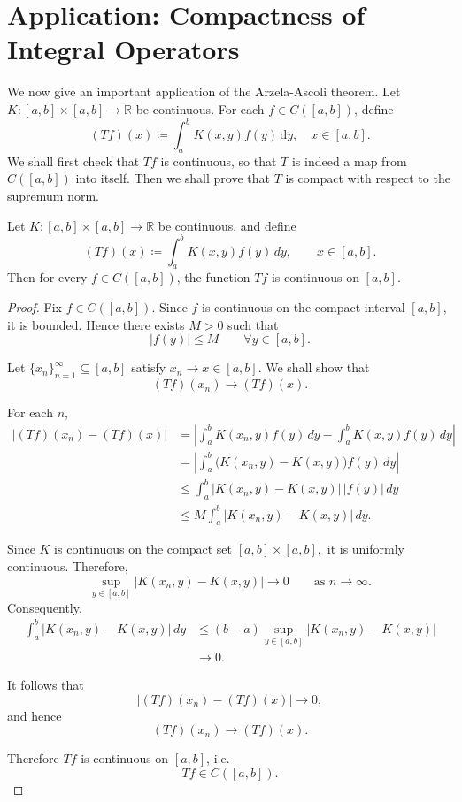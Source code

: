
\section{Application: Compactness of Integral Operators}
We now give an important application of the Arzela-Ascoli theorem. Let \(K : [a, b] \times [a, b] \to \mathbb{R}\) be continuous. For each \(f \in C([a, b])\), define 
\[
    (Tf)(x) \coloneqq \int _a^b K(x, y) f(y) \, \mathrm{d} y, \quad x \in [a, b]. 
\]  
We shall first check that \(Tf\) is continuous, so that \(T\) is indeed a map from \(C([a, b])\) into itself. Then we shall prove that \(T\) is compact with respect to the supremum norm. 

\begin{proposition}
Let \(K : [a,b]\times[a,b]\to\mathbb{R}\) be continuous, and define
\[
    (Tf)(x)\coloneqq \int_a^b K(x,y)f(y)\,dy,
    \qquad x\in[a,b].
\]
Then for every \(f\in C([a,b])\), the function \(Tf\) is continuous on \([a,b]\).
\end{proposition}

\begin{proof}
Fix \(f\in C([a,b])\). Since \(f\) is continuous on the compact interval \([a,b]\), it is bounded. Hence there exists \(M>0\) such that
\[
    |f(y)|\le M
    \qquad \forall y\in[a,b].
\]

Let \(\{x_n\}_{n=1}^\infty \subseteq [a,b]\) satisfy \(x_n\to x\in[a,b]\). We shall show that
\[
    (Tf)(x_n)\to (Tf)(x).
\]

For each \(n\),
\[
\begin{aligned}
    |(Tf)(x_n)-(Tf)(x)|
    &= \left|
        \int_a^b K(x_n,y)f(y)\,dy
        -
        \int_a^b K(x,y)f(y)\,dy
    \right| \\
    &= \left|
        \int_a^b \bigl(K(x_n,y)-K(x,y)\bigr)f(y)\,dy
    \right| \\
    &\le
    \int_a^b
        |K(x_n,y)-K(x,y)|\,|f(y)|
    \,dy \\
    &\le
    M\int_a^b |K(x_n,y)-K(x,y)|\,dy.
\end{aligned}
\]

Since \(K\) is continuous on the compact set
\(
[a,b]\times[a,b],
\)
it is uniformly continuous. Therefore,
\[
    \sup_{y\in[a,b]}
    |K(x_n,y)-K(x,y)|
    \to 0
    \qquad \text{as } n\to\infty.
\]
Consequently,
\[
\begin{aligned}
    \int_a^b |K(x_n,y)-K(x,y)|\,dy
    &\le
    (b-a)
    \sup_{y\in[a,b]}
    |K(x_n,y)-K(x,y)| \\
    &\to 0.
\end{aligned}
\]

It follows that
\[
    |(Tf)(x_n)-(Tf)(x)|\to 0,
\]
and hence
\[
    (Tf)(x_n)\to (Tf)(x).
\]

Therefore \(Tf\) is continuous on \([a,b]\), i.e.
\[
    Tf\in C([a,b]).
\]
\end{proof}

